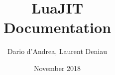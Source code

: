 \title{\huge \textbf {LuaJIT}\\
\LARGE \textbf {Documentation}}
\author{Dario d'Andrea, Laurent Deniau}
\date{November 2018}